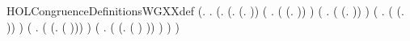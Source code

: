 \begin{SaveVerbatim}{HOLCongruenceDefinitionsWGXXdef}
\HOLTokenTurnstile{}  \HOLSymConst{=}
   (\HOLTokenLambda{}.
        \HOLSymConst{\HOLTokenForall{}}.
            (\HOLSymConst{\HOLTokenForall{}}.
                 (\HOLSymConst{\HOLTokenExists{}}.  \HOLSymConst{=} (\HOLTokenLambda{}. )) \HOLSymConst{\HOLTokenDisj{}}
                 (\HOLSymConst{\HOLTokenExists{}} . ( \HOLSymConst{=} (\HOLTokenLambda{}.  )) \HOLSymConst{\HOLTokenConj{}}  ) \HOLSymConst{\HOLTokenDisj{}}
                 (\HOLSymConst{\HOLTokenExists{}} .
                      ( \HOLSymConst{=} (\HOLTokenLambda{}.   \HOLSymConst{\ensuremath{+}}  )) \HOLSymConst{\HOLTokenConj{}}   \HOLSymConst{\HOLTokenConj{}}  ) \HOLSymConst{\HOLTokenDisj{}}
                 (\HOLSymConst{\HOLTokenExists{}} .
                      ( \HOLSymConst{=} (\HOLTokenLambda{}.   \HOLSymConst{\ensuremath{\parallel}}  )) \HOLSymConst{\HOLTokenConj{}}   \HOLSymConst{\HOLTokenConj{}}  ) \HOLSymConst{\HOLTokenDisj{}}
                 (\HOLSymConst{\HOLTokenExists{}} . ( \HOLSymConst{=} (\HOLTokenLambda{}. \HOLConst{\ensuremath{\nu}}  ( ))) \HOLSymConst{\HOLTokenConj{}}  ) \HOLSymConst{\HOLTokenDisj{}}
                 (\HOLSymConst{\HOLTokenExists{}} . ( \HOLSymConst{=} (\HOLTokenLambda{}.  ( ) )) \HOLSymConst{\HOLTokenConj{}}  ) \HOLSymConst{\HOLTokenImp{}}
                  ) \HOLSymConst{\HOLTokenImp{}}
             )
\end{SaveVerbatim}
